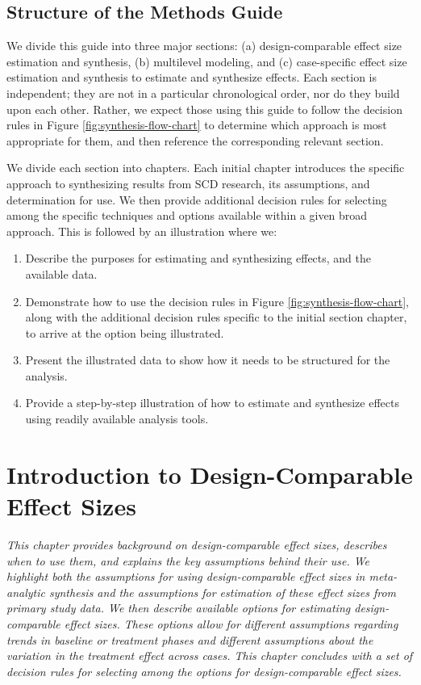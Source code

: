 \documentclass[
]{book}
\begin{document}
\hypertarget{structure-of-the-methods-guide}{%
\section{Structure of the Methods Guide}\label{structure-of-the-methods-guide}}

We divide this guide into three major sections:
(a) design-comparable effect size estimation and synthesis,
(b) multilevel modeling, and
(c) case-specific effect size estimation and synthesis to estimate and synthesize effects.
Each section is independent; they are not in a particular chronological order, nor do they build upon each other.
Rather, we expect those using this guide to follow the decision rules in Figure \ref{fig:synthesis-flow-chart} to determine which approach is most appropriate for them, and then reference the corresponding relevant section.

We divide each section into chapters.
Each initial chapter introduces the specific approach to synthesizing results from SCD research, its assumptions, and determination for use.
We then provide additional decision rules for selecting among the specific techniques and options available within a given broad approach.
This is followed by an illustration where we:

\begin{enumerate}
\def\labelenumi{\arabic{enumi}.}
\item
  Describe the purposes for estimating and synthesizing effects, and the available data.
\item
  Demonstrate how to use the decision rules in Figure \ref{fig:synthesis-flow-chart}, along with the additional decision rules specific to the initial section chapter, to arrive at the option being illustrated.
\item
  Present the illustrated data to show how it needs to be structured for the analysis.
\item
  Provide a step-by-step illustration of how to estimate and synthesize effects using readily available analysis tools.
\end{enumerate}

\hypertarget{D-CES}{%
\chapter{Introduction to Design-Comparable Effect Sizes}\label{D-CES}}


\emph{This chapter provides background on design-comparable effect sizes, describes when to use them, and explains the key assumptions behind their use.
We highlight both the assumptions for using design-comparable effect sizes in meta-analytic synthesis and the assumptions for estimation of these effect sizes from primary study data.
We then describe available options for estimating design-comparable effect sizes.
These options allow for different assumptions regarding trends in baseline or treatment phases and different assumptions about the variation in the treatment effect across cases.
This chapter concludes with a set of decision rules for selecting among the options for design-comparable effect sizes.}
\end{document}
